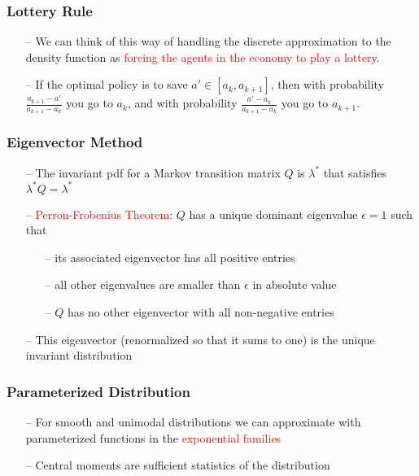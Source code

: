 \documentclass[aspectratio=169, 11pt]{beamer}
\begin{document}
\begin{frame}
\frametitle{Lottery Rule}
  \begin{itemize}
    \item[--] We can think of this way of handling the discrete approximation to the density function as \textcolor{red}{forcing the agents in the economy to play a lottery}.
    \bigskip
    \item[--] If the optimal policy is to save $a'\in\left[a_{k},a_{k+1}\right]$, then with probability $\frac{a_{k+1}-a'}{a_{k+1}-a_{k}}$ you go to $a_{k}$, and with probability $\frac{a'-a_{k}}{a_{k+1}-a_{k}}$ you go to $a_{k+1}$.
  \end{itemize}
\end{frame}

\begin{frame}
\frametitle{Eigenvector Method}
  \begin{itemize}
    \item[--] The invariant pdf for a Markov transition matrix $Q$ is $\lambda^{*}$ that satisfies $\lambda^{*}Q=\lambda^{*}$
    \bigskip
    \item[--] \textcolor{red}{Perron-Frobenius Theorem}: $Q$ has a unique dominant eigenvalue $\epsilon=1$ such that
    \begin{itemize}
      \medskip
      \item[--] its associated eigenvector has all positive entries
      \medskip
      \item[--] all other eigenvalues are smaller than $\epsilon$ in absolute value
      \medskip
      \item[--] $Q$ has no other eigenvector with all non-negative entries
    \end{itemize}
    \bigskip
    \item[--] This eigenvector (renormalized so that it sums to one) is the unique invariant distribution
  \end{itemize}
\end{frame}

\begin{frame}
\frametitle{Parameterized Distribution}
  \begin{itemize}
    \item[--] For smooth and unimodal distributions we can approximate with parameterized functions in the \textcolor{red}{exponential families}
    \bigskip
    \item[--] Central moments are sufficient statistics of the distribution
  \end{itemize}
\end{frame}
\end{document}
